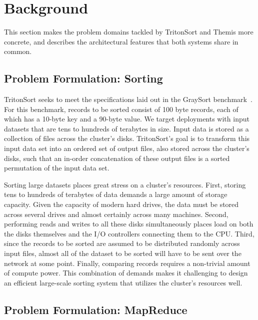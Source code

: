 \chapter{Background}
\label{chapter:background}

This section makes the problem domains tackled by TritonSort and Themis more
concrete, and describes the architectural features that both systems share in
common.

\section{Problem Formulation: Sorting}

TritonSort seeks to meet the specifications laid out in the GraySort
benchmark~\cite{terasort}. For this benchmark, records to be sorted consist of
100 byte records, each of which has a 10-byte key and a 90-byte value. We
target deployments with input datasets that are tens to hundreds of terabytes
in size. Input data is stored as a collection of files across the cluster's
disks. TritonSort's goal is to transform this input data set into an ordered
set of output files, also stored across the cluster's disks, such that an
in-order concatenation of these output files is a sorted permutation of the
input data set.

Sorting large datasets places great stress on a cluster's resources.  First,
storing tens to hundreds of terabytes of data demands a large amount of storage
capacity. Given the capacity of modern hard drives, the data must be stored
across several drives and almost certainly across many machines. Second,
performing reads and writes to all these disks simultaneously places load on
both the disks themselves and the I/O controllers connecting them to the
CPU. Third, since the records to be sorted are assumed to be distributed
randomly across input files, almost all of the dataset to be sorted will have
to be sent over the network at some point. Finally, comparing records requires
a non-trivial amount of compute power. This combination of demands makes it
challenging to design an efficient large-scale sorting system that utilizes the
cluster's resources well.

\section{Problem Formulation: MapReduce}

